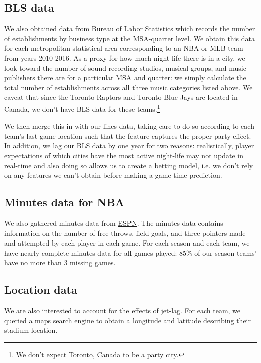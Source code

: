 \documentclass[letterpaper,12pt]{article}
\begin{document}
\subsection{BLS data} We also obtained data from
\href{https://www.bls.gov/data/}{Bureau of Labor Statistics} which records the number of establishments by business type at the MSA-quarter level. We obtain this data for each metropolitan statistical area corresponding
to an NBA or MLB team from years 2010-2016. 
As a proxy for how much night-life there is in a city, we look toward the 
number of sound recording studios, musical groups, and music publishers there 
are for a particular MSA and quarter: we simply calculate the total number of establishments across all three music categories listed above. We caveat that since the Toronto Raptors and Toronto Blue Jays are located in Canada, 
we don't have BLS data for these teams.\footnote{We don't expect Toronto, Canada to be a party city.}

We then merge this in with our lines data, taking care to do so according to each team's last game location such that the feature captures the proper
party effect. In addition, we lag our BLS data by one year for two reasons:
realistically, player expectations of which cities have the most active night-life may not
update in real-time and also doing so allows us to create a betting model, i.e.
we don't rely on any features we can't obtain before making a game-time prediction. 

\subsection{Minutes data for NBA}
We also gathered minutes data from \href{http://www.espn.com/nba/scoreboard/_/date/}{ESPN}.
The minutes data contains information on the number of free throws, field goals, and three pointers made and attempted by each player in each game.
For each season and each team, we have nearly complete 
minutes data for all games played: 85\% of our season-teams' have no more than 3 missing games.

\subsection{Location data} We are also interested
to account for the effects of jet-lag. For each team, we queried
a maps search engine to obtain a longitude and latitude describing their
stadium location.\citep{ggmap}
\end{document}
